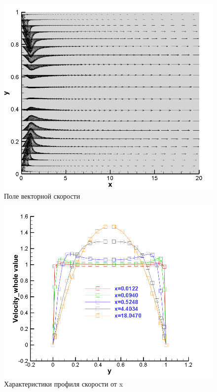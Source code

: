\documentclass[12pt, a4paper]{article}
\begin{document}
\begin{figure}[H]
    \centering
    \includegraphics[scale = 0.6]{figure/RE135_vector.png}
    \caption{Поле векторной скорости}
    \label{pic3}
\end{figure}

\begin{figure}[H]
    \centering
    \includegraphics[scale = 0.6]{figure/RE135_speed.png}
    \caption{Характеристики профиля скорости от x}
    \label{pic4}
\end{figure}
\end{document}
